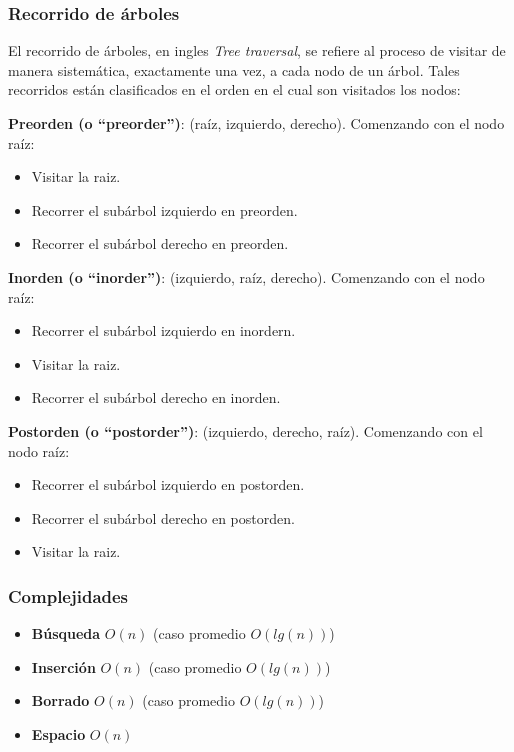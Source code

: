 \subsubsection{Recorrido de \'arboles}

El recorrido de \'arboles, en ingles \textit{Tree traversal}, se refiere al proceso de visitar de manera sistem\'atica, exactamente una vez, a cada nodo de un \'arbol. Tales recorridos est\'an clasificados en el orden en el cual son visitados los nodos:

\textbf{Preorden (o ``preorder'')}: (ra\'iz, izquierdo, derecho). Comenzando con el nodo ra\'iz:
\begin{itemize}
 \item Visitar la raiz.
 \item Recorrer el sub\'arbol izquierdo en preorden.
 \item Recorrer el sub\'arbol derecho en preorden.
\end{itemize}

\textbf{Inorden (o ``inorder'')}:  (izquierdo, ra\'iz, derecho). Comenzando con el nodo ra\'iz:
\begin{itemize}
 \item Recorrer el sub\'arbol izquierdo en inordern.
 \item Visitar la raiz.
 \item Recorrer el sub\'arbol derecho en inorden.
\end{itemize}

\textbf{Postorden (o ``postorder'')}:  (izquierdo, derecho, ra\'iz). Comenzando con el nodo ra\'iz:
\begin{itemize}
 \item Recorrer el sub\'arbol izquierdo en postorden.
 \item Recorrer el sub\'arbol derecho en postorden.
 \item Visitar la raiz.
\end{itemize}

\subsubsection{Complejidades}

\begin{itemize}
 \item \textbf{B\'usqueda} $O(n)$ (caso promedio $O(lg(n))$)
 \item \textbf{Inserci\'on} $O(n)$ (caso promedio $O(lg(n))$)
 \item \textbf{Borrado} $O(n)$ (caso promedio $O(lg(n))$)
 \item \textbf{Espacio} $O(n)$
\end{itemize}

